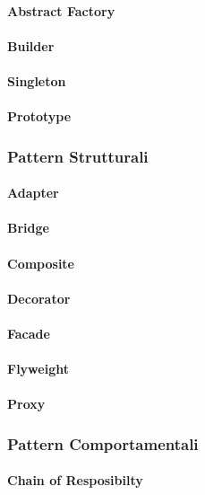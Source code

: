 \documentclass{article}
\begin{document}
            \paragraph{Abstract Factory}
            \paragraph{Builder}
            \paragraph{Singleton}
            \paragraph{Prototype}
        \subsubsection{Pattern Strutturali}
            \paragraph{Adapter}
            \paragraph{Bridge}
            \paragraph{Composite}
            \paragraph{Decorator}
            \paragraph{Facade}
            \paragraph{Flyweight}
            \paragraph{Proxy}
        \subsubsection{Pattern Comportamentali}
            \paragraph{Chain of Resposibilty}
\end{document}
